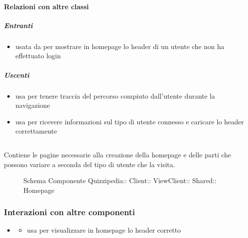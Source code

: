 \paragraph{Relazioni con altre classi}
\subparagraph{Entranti}
\begin{itemize}
\item usata da  per mostrare in homepage lo header di un utente che non ha effettuato login
\end{itemize}
\subparagraph{Uscenti}
\begin{itemize}
\item usa  per tenere traccia del percorso compiuto dall'utente durante la navigazione
\item usa  per ricevere informazioni sul tipo di utente connesso e caricare lo header correttamente
\end{itemize}
\subsection{}
Contiene le pagine necessarie alla creazione della homepage e delle parti che possono variare a seconda del tipo di utente che la visita.
\begin{figure}[H]
\centering
\noindent{}
\caption[Schema Componente Homepage]{Schema Componente Quizzipedia:: Client:: ViewClient:: Shared:: Homepage}
\end{figure}
\subsubsection{Interazioni con altre componenti}
\begin{itemize}
\item {}
\begin{itemize}
\item usa  per visualizzare in homepage lo header corretto
\end{itemize}
\end{itemize}
